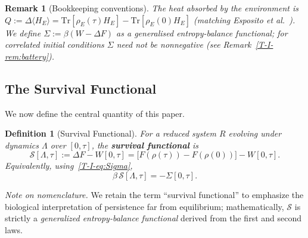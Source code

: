 \documentclass[12pt,a4paper,openany]{book}
\newtheorem{definition}[theorem]{Definition}
\newtheorem{remark}[theorem]{Remark}
\begin{document}
\begin{remark}[Bookkeeping conventions]
\label{T-I-rem:bookkeeping}
The heat absorbed by the environment is
$Q := \Delta\langle H_E \rangle
= \mathrm{Tr}[\rho_E(\tau) H_E]
  - \mathrm{Tr}[\rho_E(0) H_E]$
(matching
Esposito \emph{et al.}~\cite{EspositoLindenbergVandenBroeck2010}).
We define $\Sigma := \beta(W - \Delta F)$ as a
\emph{generalised entropy-balance functional};
for correlated initial conditions $\Sigma$ need not be
nonnegative
(see Remark~\ref{T-I-rem:battery}).
\end{remark}

\subsection{The Survival Functional}
\label{T-I-subsec:survival}

We now define the central quantity of this paper.

\begin{definition}[Survival Functional]
\label{T-I-def:survival}
For a reduced system $R$ evolving under dynamics $\Lambda$
over $[0,\tau]$, the \textbf{survival functional} is
\begin{equation}
\label{T-I-eq:survival}
\mathcal{S}[\Lambda, \tau]
:= \Delta F - W[0,\tau]
= \bigl[F(\rho(\tau)) - F(\rho(0))\bigr] - W[0,\tau].
\end{equation}
Equivalently, using~\eqref{T-I-eq:Sigma},
\begin{equation}
\label{T-I-eq:survival_Sigma}
\beta\,\mathcal{S}[\Lambda,\tau] = -\Sigma[0,\tau].
\end{equation}
\end{definition}

\noindent\textit{Note on nomenclature.}
We retain the term ``survival functional'' to emphasize
the biological interpretation of persistence far from
equilibrium; mathematically, $\mathcal{S}$ is strictly a
\emph{generalized entropy-balance functional} derived from
the first and second laws.
\end{document}
